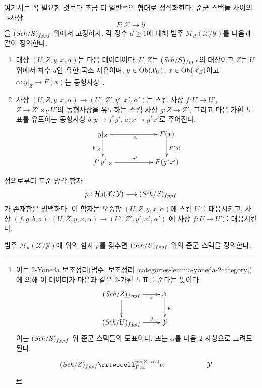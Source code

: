 \noindent
여기서는 꼭 필요한 것보다 조금 더 일반적인 형태로 정식화한다. 준군 스택들
사이의 $1$-사상
$$
F : \mathcal{X} \longrightarrow \mathcal{Y}
$$
을 $(\mathit{Sch}/S)_{fppf}$ 위에서 고정하자. 각 정수 $d \geq 1$에 대해 범주
$\mathcal{H}_d(\mathcal{X}/\mathcal{Y})$를 다음과 같이 정의한다.
\begin{enumerate}
\item 대상 $(U, Z, y, x, \alpha)$는 다음 데이터이다. $U, Z$는
$(\mathit{Sch}/S)_{fppf}$의 대상이고 $Z$는 $U$ 위에서 차수 $d$인 유한 국소
자유이며,
$y \in \mathop{\mathrm{Ob}}\nolimits(\mathcal{Y}_U)$, $x \in \mathop{\mathrm{Ob}}\nolimits(\mathcal{X}_Z)$이고
$\alpha : y|_Z \to F(x)$는 동형사상\footnote{
이는 $2$-Yoneda 보조정리(범주, 보조정리
\ref{categories-lemma-yoneda-2category})에 의해 이 데이터가 다음과 같은
$2$-가환 도표를 준다는 뜻이다.
$$
\xymatrix{
(\Sch/Z)_{fppf} \ar[r]_-x \ar[d] & \mathcal{X} \ar[d]^F \\
(\Sch/U)_{fppf} \ar[r]^-y & \mathcal{Y}
}
$$
이는 $(\mathit{Sch}/S)_{fppf}$ 위 준군 스택들의 도표이다. 또는 $\alpha$를 다음
$2$-사상으로 그려도 된다.
$$
\xymatrix{
(\Sch/Z)_{fppf}
\rrtwocell^{y \circ (Z \to U)}_{F \circ x}{\alpha} & &
\mathcal{Y}.
}
$$
}.
\item 사상 $(U, Z, y, x, \alpha) \to (U', Z', y', x', \alpha')$는 스킴
사상 $f : U \to U'$, $Z \to Z' \times_U U'$의 동형사상을 유도하는 스킴
사상 $g : Z \to Z'$, 그리고 다음 가환 도표를 유도하는 동형사상
$b : y \to f^*y'$, $a : x \to g^*x'$로 주어진다.
$$
\xymatrix{
y|_Z \ar[rr]_\alpha \ar[d]_{b|_Z} & &
F(x) \ar[d]^{F(a)} \\
f^*y'|_Z \ar[rr]^{\alpha'} & &
F(g^*x') \\
}
$$
\end{enumerate}
정의로부터 표준 망각 함자
$$
p :
\mathcal{H}_d(\mathcal{X}/\mathcal{Y})
\longrightarrow
(\mathit{Sch}/S)_{fppf}
$$
가 존재함은 명백하다. 이 함자는 오중항 $(U, Z, y, x, \alpha)$에 스킴 $U$를
대응시키고, 사상
$(f, g, b, a) : (U, Z, y, x, \alpha) \to (U', Z', y', x', \alpha')$
에 사상 $f : U \to U'$를 대응시킨다.

\begin{lemma}
\label{lemma-hilbert-d-stack}
범주 $\mathcal{H}_d(\mathcal{X}/\mathcal{Y})$에 위의 함자 $p$를 갖추면
$(\mathit{Sch}/S)_{fppf}$ 위의 준군 스택을 정의한다.
\end{lemma}

